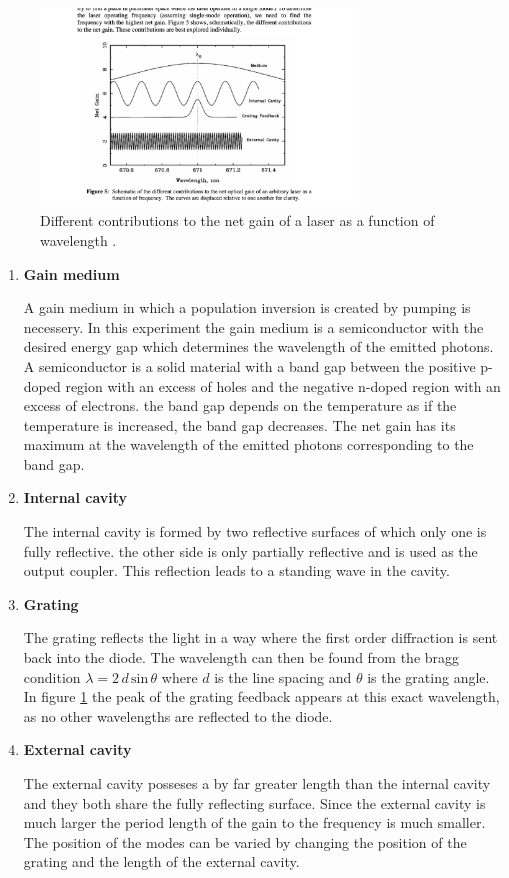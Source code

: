 \begin{figure}
  \centering
  \includegraphics[width=0.75\textwidth]{net_gain.pdf}
  \caption{Different contributions to the net gain of a laser as a function of wavelength \cite{V60}.}
  \label{fig:netgain}
\end{figure}

\begin{enumerate}
\item \textbf{Gain medium}

\noindent
A gain medium in which a population inversion is created by pumping is necessery.
In this experiment the gain medium is a semiconductor with the desired energy gap which determines the wavelength of the emitted photons.
A semiconductor is a solid material with a band gap between the positive p-doped region with an excess of holes and the negative n-doped region with an excess of electrons.
the band gap depends on the temperature as if the temperature is increased, the band gap decreases.
The net gain has its maximum at the wavelength of the emitted photons corresponding to the band gap.

\item \textbf{Internal cavity}

\noindent
The internal cavity is formed by two reflective surfaces of which only one is fully reflective.
the other side is only partially reflective and is used as the output coupler.
This reflection leads to a standing wave in the cavity.

\item \textbf{Grating}

\noindent
The grating reflects the light in a way where the first order diffraction is sent back into the diode.
The wavelength can then be found from the bragg condition $\lambda = 2 \, d \, \text{sin}\, \theta$ where $d$ is the line spacing and $\theta$ is the grating angle.
In figure \ref{fig:netgain} the peak of the grating feedback appears at this exact wavelength, as no other wavelengths are reflected to the diode.

\item \textbf{External cavity}

\noindent
The external cavity posseses a by far greater length than the internal cavity and they both share the fully reflecting surface.
Since the external cavity is much larger the period length of the gain to the frequency is much smaller.
The position of the modes can be varied by changing the position of the grating and the length of the external cavity.

\end{enumerate}

